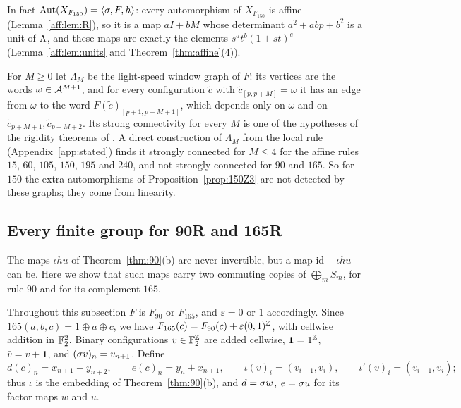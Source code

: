 In fact $\operatorname{Aut}(X_{F_{150}})=\langle\sigma,F,h\rangle$: every automorphism of $X_{F_{150}}$ is affine (Lemma~\ref{aff:lem:R}), so it is a map $aI+bM$ whose determinant $a^2+abp+b^2$ is a unit of $\Lambda$, and these maps are exactly the elements $s^at^b(1+st)^e$ (Lemma~\ref{aff:lem:units} and Theorem~\ref{thm:affine}(4)).

\begin{remark}\label{lin:rem:window}
For $M\ge0$ let $\Lambda_M$ be the light-speed window graph of $F$: its vertices are the words $\omega\in\mathcal{A}^{M+1}$, and for every configuration $\tilde c$ with $\tilde c_{[p,p+M]}=\omega$ it has an edge from $\omega$ to the word $F(\tilde c)_{[p+1,p+M+1]}$, which depends only on $\omega$ and on $\tilde c_{p+M+1},\tilde c_{p+M+2}$. Its strong connectivity for every $M$ is one of the hypotheses of the rigidity theorems of \cite{PaperB}. A direct construction of $\Lambda_M$ from the local rule (Appendix~\ref{app:stated}) finds it strongly connected for $M\le4$ for the affine rules $15$, $60$, $105$, $150$, $195$ and $240$, and not strongly connected for $90$ and $165$. So for $150$ the extra automorphisms of Proposition~\ref{prop:150Z3} are not detected by these graphs; they come from linearity.
\end{remark}

\subsection{Every finite group for 90R and 165R}\label{lin:sec:movers}

The maps $\iota hu$ of Theorem~\ref{thm:90}(b) are never invertible, but a map $\mathrm{id}+\iota hu$ can be. Here we show that such maps carry two commuting copies of $\bigoplus_mS_m$, for rule $90$ and for its complement $165$.

Throughout this subsection $F$ is $F_{90}$ or $F_{165}$, and $\varepsilon=0$ or $1$ accordingly. Since $165(a,b,c)=1\oplus a\oplus c$, we have $F_{165}(c)=F_{90}(c)+\varepsilon(0,1)^{\mathbb{Z}}$, with cellwise addition in $\mathbb{F}_2^2$. Binary configurations $v\in\mathbb{F}_2^{\mathbb{Z}}$ are added cellwise, $\mathbf 1=1^{\mathbb{Z}}$, $\bar v=v+\mathbf 1$, and $(\sigma v)_n=v_{n+1}$. Define
\[
d(c)_n=x_{n+1}+y_{n+2},\qquad e(c)_n=y_n+x_{n+1},\qquad \iota(v)_i=(v_{i-1},v_i),\qquad \iota'(v)_i=(v_{i+1},v_i);
\]
thus $\iota$ is the embedding of Theorem~\ref{thm:90}(b), and $d=\sigma w$, $e=\sigma u$ for its factor maps $w$ and $u$.

